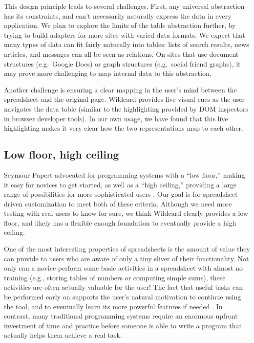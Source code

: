 \documentclass[english,submission]{programming}
\begin{document}
This design principle leads to several challenges. First, any universal
abstraction has its constraints, and can't necessarily naturally express
the data in every application. We plan to explore the limits of the
table abstraction further, by trying to build adapters for more sites
with varied data formats. We expect that many types of data can fit
fairly naturally into tables: lists of search results, news articles,
and messages can all be seen as relations. On sites that use document
structures (e.g.~Google Docs) or graph structures (e.g.~social friend
graphs), it may prove more challenging to map internal data to this
abstraction.

Another challenge is ensuring a clear mapping in the user's mind between
the spreadsheet and the original page. Wildcard provides live visual
cues as the user navigates the data table (similar to the highlighting
provided by DOM inspectors in browser developer tools). In our own
usage, we have found that this live highlighting makes it very clear how
the two representations map to each other.

\hypertarget{low-floor-high-ceiling}{%
\subsection{Low floor, high ceiling}\label{low-floor-high-ceiling}}

Seymour Papert advocated for programming systems with a ``low floor,''
making it easy for novices to get started, as well as a ``high
ceiling,'' providing a large range of possibilities for more
sophisticated users \autocite{resnick2016}. Our goal is for
spreadsheet-driven customization to meet both of these criteria.
Although we need more testing with real users to know for sure, we think
Wildcard clearly provides a low floor, and likely has a flexible enough
foundation to eventually provide a high ceiling.

One of the most interesting properties of spreadsheets is the amount of
value they can provide to users who are aware of only a tiny sliver of
their functionality. Not only can a novice perform some basic activities
in a spreadsheet with almost no training (e.g., storing tables of
numbers or computing simple sums), these activities are often actually
valuable for the user! The fact that useful tasks can be performed early
on supports the user's natural motivation to continue using the tool,
and to eventually learn its more powerful features if needed
\autocite{nardi1991}. In contrast, many traditional programming systems
require an enormous upfront investment of time and practice before
someone is able to write a program that actually helps them achieve a
real task.
\end{document}
